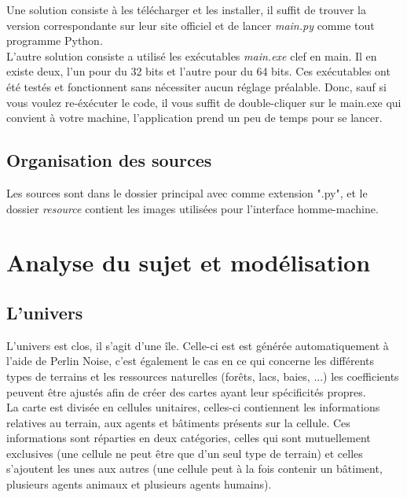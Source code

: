 \documentclass[12pt]{article}
\begin{document}
Une solution consiste à les télécharger et les installer, il suffit de trouver 
la version correspondante sur leur site officiel et de lancer \textit{main.py} 
comme tout programme Python.\\

L'autre solution consiste a utilisé les exécutables \textit{main.exe} clef en 
main. Il en existe deux, l'un pour du 32 bits et l'autre pour du 64 bits. Ces 
exécutables ont été testés et fonctionnent sans nécessiter aucun réglage 
préalable. Donc, sauf si vous voulez re-éxécuter le code, il vous suffit de 
double-cliquer sur le main.exe qui convient à votre machine, l'application 
prend un peu de temps pour se lancer.\\

	\subsection{Organisation des sources}

Les sources sont dans le dossier principal avec comme extension ".py", et le 
dossier \textit{resource} contient les images utilisées pour l'interface 
homme-machine.

\section{Analyse du sujet et modélisation}

	\subsection{L'univers}

L'univers est clos, il s'agit d'une île. Celle-ci est est générée 
automatiquement à l'aide de Perlin Noise, c'est également le cas en ce qui 
concerne les différents types de terrains et les ressources naturelles 
(forêts, lacs, baies, ...) les coefficients peuvent être ajustés afin de créer 
des cartes ayant leur spécificités propres.\\


La carte est divisée en cellules unitaires, celles-ci contiennent les 
informations relatives au terrain, aux agents et bâtiments présents sur la 
cellule. Ces informations sont réparties en deux catégories, celles qui sont 
mutuellement exclusives (une cellule ne peut être que d'un seul type de 
terrain) et celles s'ajoutent les unes aux autres (une cellule peut à la fois 
contenir un bâtiment, plusieurs agents animaux et plusieurs agents humains).\\
\end{document}
